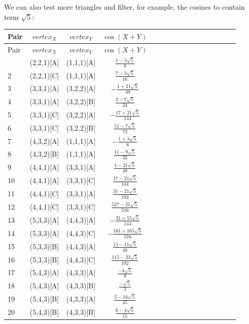 \documentclass[11pt]{article}
\begin{document}
We can also test more triangles and filter, for example, the cosines to contain term $\sqrt{5}$:
\begin{longtable}{ | p{1cm}| *{15}{c|} }
\hline
Pair & $vertex_X$ & $vertex_Y$ & $\cos(X+Y)$ \\
\hline\endhead
\hline
Pair & $vertex_X$ & $vertex_Y$ & $\cos(X+Y)$ \\
\hline\endfoot
1 & (2,2,1)[A] & (1,1,1)[A] & $\frac{1-3\sqrt{5}}{8}$\\ %
2 & (2,2,1)[C] & (1,1,1)[A] & $\frac{7-3\sqrt{5}}{16}$\\ %
3 & (3,3,1)[A] & (3,2,2)[A] & $-\frac{1+21\sqrt{5}}{48}$\\ %
4 & (3,3,1)[A] & (3,2,2)[B] & $\frac{3-7\sqrt{5}}{24}$\\ %
5 & (3,3,1)[C] & (3,2,2)[A] & $-\frac{17+21\sqrt{5}}{144}$\\ %
6 & (3,3,1)[C] & (3,2,2)[B] & $\frac{51-7\sqrt{5}}{72}$\\ %
7 & (4,3,2)[A] & (1,1,1)[A] & $-\frac{1+3\sqrt{5}}{8}$\\ %
8 & (4,3,2)[B] & (1,1,1)[A] & $\frac{11-9\sqrt{5}}{32}$\\ %
9 & (4,4,1)[A] & (3,3,1)[A] & $\frac{1-21\sqrt{5}}{48}$\\ %
10 & (4,4,1)[A] & (3,3,1)[C] & $\frac{17-21\sqrt{5}}{144}$\\ %
11 & (4,4,1)[C] & (3,3,1)[A] & $\frac{31-21\sqrt{5}}{192}$\\ %
12 & (4,4,1)[C] & (3,3,1)[C] & $\frac{527-21\sqrt{5}}{576}$\\ %
13 & (5,3,3)[A] & (4,4,3)[A] & $-\frac{21+55\sqrt{5}}{144}$\\ %
14 & (5,3,3)[A] & (4,4,3)[C] & $-\frac{161+165\sqrt{5}}{576}$\\ %
15 & (5,3,3)[B] & (4,4,3)[A] & $\frac{15-11\sqrt{5}}{48}$\\ %
16 & (5,3,3)[B] & (4,4,3)[C] & $\frac{115-33\sqrt{5}}{192}$\\ %
17 & (5,4,3)[A] & (4,3,3)[A] & $\frac{-4\sqrt{5}}{9}$\\ %
18 & (5,4,3)[A] & (4,3,3)[B] & $\frac{-\sqrt{5}}{3}$\\ %
19 & (5,4,3)[B] & (4,3,3)[A] & $\frac{3-16\sqrt{5}}{45}$\\ %
20 & (5,4,3)[B] & (4,3,3)[B] & $\frac{6-4\sqrt{5}}{15}$\\ %

\end{longtable}
\end{document}
